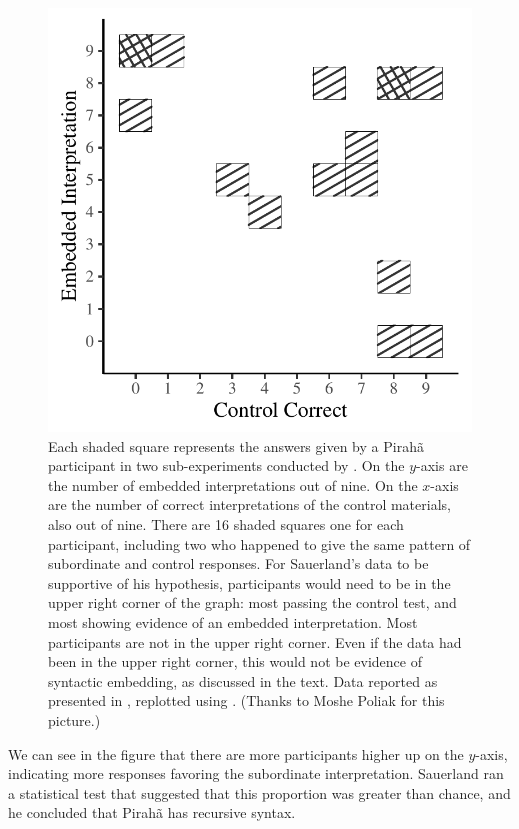 \documentclass[output=paper]{langscibook}
\begin{document}
\begin{figure}
    \includegraphics[width=.75\textwidth]{gibson_figure1.pdf}
    \caption{Each shaded square represents the answers given by a Pirahã participant in two sub-experiments conducted by \citet{sauerland2018false}. On the $y$-axis are the number of embedded interpretations out of nine. On the $x$-axis are the number of correct interpretations of the control materials, also out of nine. There are 16 shaded squares one for each participant, including two who happened to give the same pattern of subordinate and control responses.  \newline \newline For Sauerland's data to be supportive of his hypothesis, participants would need to be in the upper right corner of the graph:  most passing the control test, and most showing evidence of an embedded interpretation.  Most participants are not in the upper right corner. Even if the data had been in the upper right corner, this would not be evidence of syntactic embedding, as discussed in the text. \newline \newline
    Data reported as presented in \citet{sauerland2018false}, replotted using \citet{r2023, wickham2016, ggpattern2022}. (Thanks to Moshe Poliak for this picture.)}
    \label{fig:gibson:fig1}
\end{figure}

We can see in the figure that there are more participants higher up on the $y$-axis, indicating more responses favoring the subordinate interpretation. Sauerland ran a statistical test that suggested that this proportion was greater than chance, and he concluded that Pirahã has recursive syntax.
\end{document}
